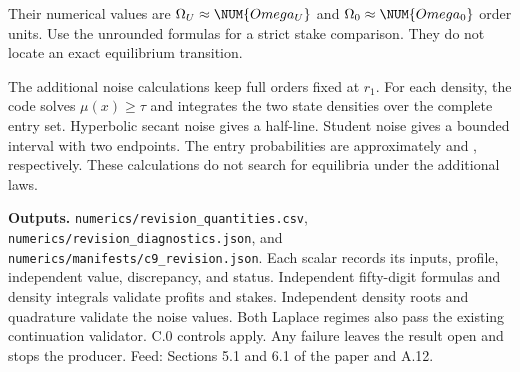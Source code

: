Their numerical values are \(\Omega_U\approx\NUM{Omega_U}\) and
\(\Omega_0\approx\NUM{Omega_0}\) order units. Use the unrounded formulas
for a strict stake comparison. They do not locate an exact equilibrium
transition.

The additional noise calculations keep full orders fixed at \(r_1\).
For each density, the code solves \(\mu(x)\ge\tau\) and integrates the
two state densities over the complete entry set. Hyperbolic secant noise
gives a half-line. Student noise gives a bounded interval with two
endpoints. The entry probabilities are approximately
 and , respectively.
These calculations do not search for equilibria under the additional
laws.

\textbf{Outputs.} \texttt{numerics/revision\_quantities.csv},
\texttt{numerics/revision\_diagnostics.json}, and
\texttt{numerics/manifests/c9\_revision.json}. Each scalar records its
inputs, profile, independent value, discrepancy, and status. Independent
fifty-digit formulas and density integrals validate profits and stakes.
Independent density roots and quadrature validate the noise values. Both
Laplace regimes also pass the existing continuation validator. C.0
controls apply. Any failure leaves the result open and stops the
producer. Feed: Sections 5.1 and 6.1 of the paper and A.12.
